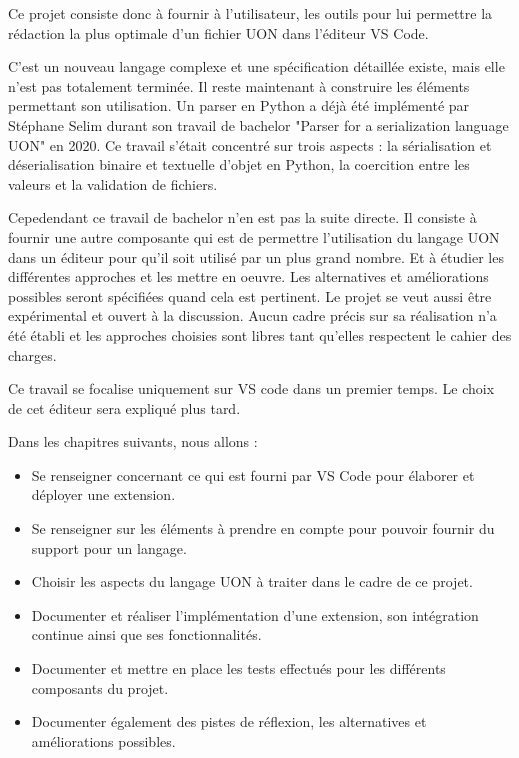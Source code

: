 \documentclass[
    iict, %
    il, %
]{heig-tb}
\begin{document}
Ce projet consiste donc à fournir à l'utilisateur, les outils pour lui permettre la rédaction la plus optimale d'un fichier UON dans l'éditeur VS Code.

C'est un nouveau langage complexe et une spécification détaillée existe, mais elle n'est pas totalement terminée. Il reste maintenant à construire les éléments permettant son utilisation.
Un parser en Python a déjà été implémenté par Stéphane Selim durant son travail de bachelor "Parser for a serialization language UON" en 2020.
Ce travail s'était concentré sur trois aspects : la sérialisation et déserialisation binaire et textuelle d'objet en Python, la coercition entre les valeurs et la validation de fichiers.

Cepedendant ce travail de bachelor n'en est pas la suite directe.
Il consiste à fournir une autre composante qui est de permettre l'utilisation du langage UON dans un éditeur pour qu'il soit utilisé par un plus grand nombre.
Et à étudier les différentes approches et les mettre en oeuvre.
Les alternatives et améliorations possibles seront spécifiées quand cela est pertinent.
Le projet se veut aussi être expérimental et ouvert à la discussion.
Aucun cadre précis sur sa réalisation n'a été établi et les approches choisies sont libres tant qu'elles respectent le cahier des charges.

Ce travail se focalise uniquement sur VS code dans un premier temps. Le choix de cet éditeur sera expliqué plus tard.

Dans les chapitres suivants, nous allons :

\begin{itemize}
    \item Se renseigner concernant ce qui est fourni par VS Code pour élaborer et déployer une extension.
    \item Se renseigner sur les éléments à prendre en compte pour pouvoir fournir du support pour un langage.
    \item Choisir les aspects du langage UON à traiter dans le cadre de ce projet.
    \item Documenter et réaliser l'implémentation d'une extension, son intégration continue ainsi que ses fonctionnalités.
    \item Documenter et mettre en place les tests effectués pour les différents composants du projet.
    \item Documenter également des pistes de réflexion, les alternatives et améliorations possibles.
\end{itemize}
\end{document}
